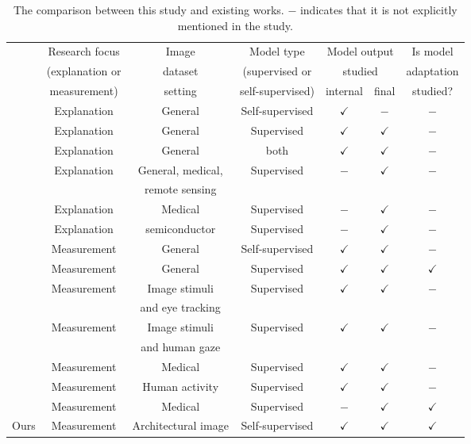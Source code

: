 \documentclass[lineno,pdflatex,sn-mathphys-num]{sn-jnl}%
\theoremstyle{thmstyleone}%
\theoremstyle{thmstyletwo}%
\theoremstyle{thmstylethree}%
\begin{document}
\begin{table}[!h]
\caption{The comparison between this study and existing works. $-$ indicates that it is not explicitly mentioned in the study.\label{table review}}
\begin{tabular}{ccccccc}
\hline
 & Research focus  & Image & Model type & \multicolumn{2}{c}{Model output}  & Is model \\
 & (explanation or & dataset & (supervised or & \multicolumn{2}{c}{ studied}  & adaptation \\
 &  measurement) & setting & self-supervised) & internal & final &  studied? \\ \hline\hline
\cite{Kang20259339} & Explanation & General & Self-supervised & $\checkmark$ & $-$ & $-$ \\
\cite{Jo2025582} & Explanation & General & Supervised & $\checkmark$ & $\checkmark$ & $-$ \\
\cite{Liao2025PR} & Explanation & General & both & $\checkmark$ & $\checkmark$ & $-$ \\
\cite{Hanna25ICCV} & Explanation & General, medical, & Supervised & $-$ & $\checkmark$ & $-$ \\
 &  & remote sensing &   &  &  & \\
\cite{Cascone25ICCV} & Explanation & Medical & Supervised & $-$ & $\checkmark$ & $-$ \\
\cite{Feng2025AI} & Explanation & semiconductor & Supervised & $-$ & $\checkmark$ & $-$ \\
\hline
\cite{park2023what} & Measurement & General & Self-supervised & $\checkmark$ & $\checkmark$ & $-$ \\
\cite{Walmer23CVPR} & Measurement & General & Supervised & $\checkmark$ & $\checkmark$ & $\checkmark$ \\
\cite{Carrasco2026} & Measurement & Image stimuli & Supervised & $\checkmark$ & $\checkmark$ & $-$ \\
 &  & and eye tracking &   &  &  & \\
\cite{Yamamoto2025} & Measurement & Image stimuli & Supervised & $\checkmark$ & $\checkmark$ & $-$ \\
 &  & and human gaze &   &  &  & \\
\cite{Cascone2026947} & Measurement & Medical & Supervised & $\checkmark$ & $\checkmark$ & $-$ \\
\cite{Tempel2025} & Measurement & Human activity & Supervised & $\checkmark$ & $\checkmark$ & $-$ \\
\cite{Chung2025110} & Measurement & Medical & Supervised & $-$ & $\checkmark$ & $\checkmark$ \\ \hline
Ours & Measurement & Architectural image & Self-supervised & $\checkmark$ & $\checkmark$ & $\checkmark$ \\ \hline
\end{tabular}
\end{table}
\end{document}
